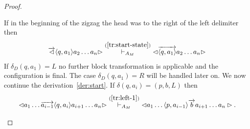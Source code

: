 \documentclass[pre,amssymb,showpacs,showkeys,preprint]{revtex4}
\begin{document}
\begin{proof}
\begin{enumerate}
If in the beginning of the zigzag the head was to the right of the left delimiter then
\begin{equation}
\overrightarrow{\lhd} \langle q,a_1 \rangle a_{2} \ldots a_n \rhd
\stackrel{(\ref{tr:start-state})}{\vdash_{A_M}}
\lhd \overrightarrow{\langle q,a_1 \rangle} a_{2} \ldots a_n \rhd
\end{equation}
If $\delta_D(q,a_1)=L$ no further block transformation is applicable and the configuration is final.
The case $\delta_D(q,a_1)=R$ will be handled later on.
We now continue the derivation~\ref{der:start}.
If $\delta(q,a_i) = (p, b, L)$ then
\begin{equation}
\lhd  a_1 \ldots \overrightarrow{a_{i-1}} \langle q,a_i \rangle a_{i+1} \ldots a_n \rhd
\stackrel{(\ref{tr:left-1})}{\vdash_{A_M}}
\lhd  a_1 \ldots \langle p,a_{i-1} \rangle \overrightarrow{b}  a_{i+1} \ldots a_n \rhd.
\label{der:tm-step-left}
\end{equation}


\end{enumerate}
\end{proof}
\end{document}
